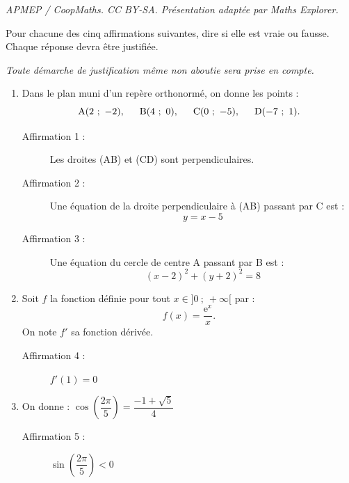 \documentclass[10pt]{article}
\providecommand{\e}{{\mathrm{e}}}
\begin{document}
\noindent\textit{APMEP / CoopMaths. CC BY-SA. Présentation adaptée par Maths Explorer.}\par\medskip
\medskip

Pour chacune des cinq affirmations suivantes, dire si elle est vraie ou fausse. Chaque réponse devra être justifiée.

\emph{Toute démarche de justification même non aboutie sera prise en compte.}

\medskip

\begin{enumerate}
\item  Dans le plan muni d'un repère orthonormé, on donne les points :
\[\text{A}(2~;~-2), \hspace{1.5em}\text{B}(4~;~0),\hspace{1.5em} \text{C}(0~;~-5),\hspace{1.5em} \text{D}(-7~;~1).\]
\begin{description}
\item[Affirmation 1 :] Les droites (AB) et (CD) sont perpendiculaires.
\item[Affirmation 2 :] Une équation de la droite perpendiculaire à (AB) passant par C est : \[y = x-5\]
\item [Affirmation 3 :] Une équation du cercle de centre A passant par B est : \[(x - 2)^2+(y + 2)^2 = 8\]
\end{description}
\item Soit $f$ la fonction définie pour tout $x\in]0~;~+\infty[$ par : \[f(x)=\frac{\e^x}{x}.\]
 On note $f'$ sa fonction dérivée.
\begin{description}
\item[Affirmation 4 :] $f'(1) = 0$
\end{description}
\item On donne : $\cos\left(\dfrac{2\pi}{5}\right)=\dfrac{-1+\sqrt{5}}{4}$
\begin{description}
\item[Affirmation 5 :] $\sin\left(\dfrac{2\pi}{5}\right)< 0$
\end{description}
\end{enumerate}

\vspace{1cm}
\end{document}
